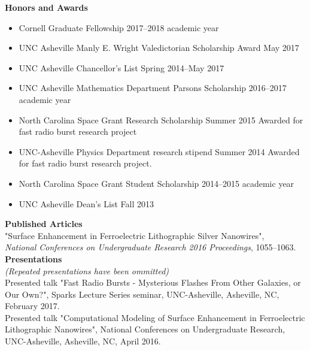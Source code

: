 \documentclass[a4paper, 11pt]{article}
\newcommand{\noi}{\noindent}
\newcommand{\ind}{\indent}
\begin{document}
\noi \textbf{Honors and Awards}
\begin{itemize}[leftmargin=*]
	\item Cornell Graduate Fellowship \hfill 2017--2018 academic year

	\item UNC Asheville Manly E. Wright Valedictorian Scholarship Award \hfill May 2017

	\item UNC Asheville Chancellor's List \hfill Spring 2014--May 2017

	\item UNC Asheville Mathematics Department Parsons Scholarship \hfill 2016--2017 academic year

	\item North Carolina Space Grant Research Scholarship \hfill Summer 2015 
	Awarded for fast radio burst research project

	\item UNC-Asheville Physics Department research stipend \hfill Summer 2014
	Awarded for fast radio burst research project.

	\item North Carolina Space Grant Student Scholarship \hfill 2014--2015 academic year

	\item UNC Asheville Dean's List \hfill Fall 2013

\end{itemize}

\noi \textbf{Published Articles}
\\

\noi "Surface Enhancement in Ferroelectric Lithographic Silver Nanowires", 
\\
	\ind \emph{National Conferences on Undergraduate Research 2016 Proceedings}, 1055--1063.
\\

\noi \textbf{Presentations}
\\
\emph{(Repeated presentations have been ommitted)}
\\

\noi Presented talk "Fast Radio Bursts - Mysterious Flashes From Other Galaxies, or Our Own?", Sparks Lecture Series seminar, UNC-Asheville, Asheville, NC, February 2017.
\\

\noi Presented talk "Computational Modeling of Surface Enhancement in Ferroelectric Lithographic Nanowires", National Conferences on Undergraduate Research, UNC-Asheville, Asheville, NC, April 2016.
\\
\end{document}
